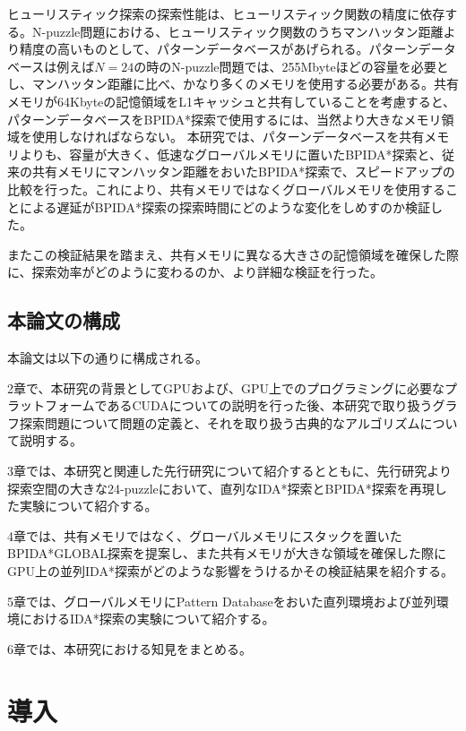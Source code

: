 \documentclass[a4paper,11pt,oneside,openany]{jsbook}
\begin{document}
ヒューリスティック探索の探索性能は、ヒューリスティック関数の精度に依存する。N-puzzle問題における、ヒューリスティック関数のうちマンハッタン距離より精度の高いものとして、パターンデータベースがあげられる。パターンデータベースは例えば$N=24$の時のN-puzzle問題では、255Mbyteほどの容量を必要とし、マンハッタン距離に比べ、かなり多くのメモリを使用する必要がある。共有メモリが64Kbyteの記憶領域をL1キャッシュと共有していることを考慮すると、パターンデータベースをBPIDA*探索で使用するには、当然より大きなメモリ領域を使用しなければならない。
本研究では、パターンデータベースを共有メモリよりも、容量が大きく、低速なグローバルメモリに置いたBPIDA*探索と、従来の共有メモリにマンハッタン距離をおいたBPIDA*探索で、スピードアップの比較を行った。これにより、共有メモリではなくグローバルメモリを使用することによる遅延がBPIDA*探索の探索時間にどのような変化をしめすのか検証した。

またこの検証結果を踏まえ、共有メモリに異なる大きさの記憶領域を確保した際に、探索効率がどのように変わるのか、より詳細な検証を行った。



\section{本論文の構成}
本論文は以下の通りに構成される。

2章で、本研究の背景としてGPUおよび、GPU上でのプログラミングに必要なプラットフォームであるCUDAについての説明を行った後、本研究で取り扱うグラフ探索問題について問題の定義と、それを取り扱う古典的なアルゴリズムについて説明する。

3章では、本研究と関連した先行研究について紹介するとともに、先行研究より探索空間の大きな24-puzzleにおいて、直列なIDA*探索とBPIDA*探索を再現した実験について紹介する。

4章では、共有メモリではなく、グローバルメモリにスタックを置いたBPIDA*GLOBAL探索を提案し、また共有メモリが大きな領域を確保した際にGPU上の並列IDA*探索がどのような影響をうけるかその検証結果を紹介する。

5章では、グローバルメモリにPattern Databaseをおいた直列環境および並列環境におけるIDA*探索の実験について紹介する。

6章では、本研究における知見をまとめる。

\chapter{導入}
\end{document}
